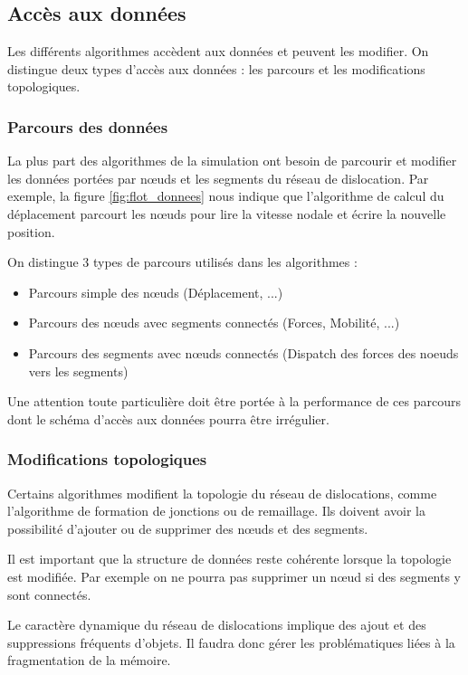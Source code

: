 \documentclass[11pt,class=article,float=false,crop=false]{standalone}
\begin{document}
\subsection{Accès aux données}

Les différents algorithmes accèdent aux données et peuvent les modifier. On distingue deux types d'accès aux données : les parcours et les modifications topologiques.

\subsubsection{Parcours des données}

La plus part des algorithmes de la simulation ont besoin de parcourir et modifier les données portées par nœuds et les segments du réseau de dislocation. Par exemple, la figure \ref{fig:flot_donnees} nous indique que l'algorithme de calcul du déplacement parcourt les nœuds pour lire la vitesse nodale et écrire la nouvelle position.

On distingue 3 types de parcours utilisés dans les algorithmes : 
\begin{itemize}
\item Parcours simple des nœuds (Déplacement, ...)
\item Parcours des nœuds avec segments connectés (Forces, Mobilité, ...)
\item Parcours des segments avec nœuds connectés (Dispatch des forces des noeuds vers les segments)
\end{itemize}

Une attention toute particulière doit être portée à la performance de ces parcours dont le schéma d'accès aux données pourra être irrégulier.

\subsubsection{Modifications topologiques}

Certains algorithmes modifient la topologie du réseau de dislocations, comme l'algorithme de formation de jonctions ou de remaillage. Ils doivent avoir la possibilité d'ajouter ou de supprimer des nœuds et des segments.

Il est important que la structure de données reste cohérente lorsque la topologie est modifiée. Par exemple on ne pourra pas supprimer un nœud si des segments y sont connectés.

Le caractère dynamique du réseau de dislocations implique des ajout et des suppressions fréquents d'objets. Il faudra donc gérer les problématiques liées à la fragmentation de la mémoire.
\end{document}
